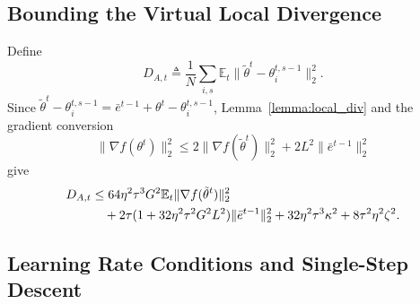 \documentclass[journal]{IEEEtran}
\begin{document}
\subsection{Bounding the Virtual Local Divergence}

Define
\begin{equation}
    D_{A,t}
    \triangleq
    \frac1N\sum_{i,s}\mathbb{E}_t\|\tilde\theta^t-\theta_i^{t,s-1}\|_2^2.
\end{equation}
Since $\tilde\theta^t-\theta_i^{t,s-1}=\bar e^{t-1}+\theta^t-\theta_i^{t,s-1}$, Lemma~\ref{lemma:local_div} and the gradient conversion
\begin{equation}
    \|\nabla f(\theta^t)\|_2^2
    \le
    2\|\nabla f(\tilde\theta^t)\|_2^2+2L^2\|\bar e^{t-1}\|_2^2
\end{equation}
give
\begin{align}
    \label{eqn:psi_bound}
    D_{A,t}
    &\le
    64\eta^2\tau^3G^2\mathbb{E}_t\|\nabla f(\tilde\theta^t)\|_2^2
    \notag\\
    &\quad+
    2\tau(1+32\eta^2\tau^2G^2L^2)\|\bar e^{t-1}\|_2^2
    +32\eta^2\tau^3\kappa^2+8\tau^2\eta^2\zeta^2.
\end{align}

\subsection{Learning Rate Conditions and Single-Step Descent}
\end{document}
